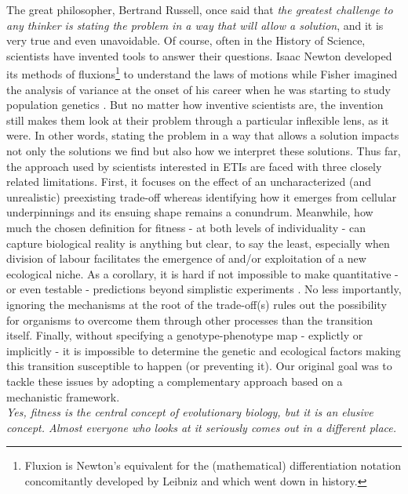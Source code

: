 The great philosopher, Bertrand Russell, once said that \textit{the greatest challenge to any thinker is stating the problem in a way that will allow a solution}, and it is very true and even unavoidable. Of course, often in the History of Science, scientists have invented tools to answer their questions. Isaac Newton developed its methods of fluxions\footnote{Fluxion is Newton's equivalent for the (mathematical) differentiation notation concomitantly developed by Leibniz and which went down in history.} to understand the laws of motions \citep{Kleiner01} while Fisher imagined the analysis of variance at the onset of his career when he was starting to study population genetics \citep{Fisher19,Fisher21,Conniffe91}. But no matter how inventive scientists are, the invention still makes them look at their problem through a particular inflexible lens, as it were. In other words, stating the problem in a way that allows a solution impacts not only the solutions we find but also how we interpret these solutions. Thus far, the approach used by scientists interested in ETIs are faced with three closely related limitations. First, it focuses on the effect of an uncharacterized (and unrealistic) preexisting trade-off whereas identifying how it emerges from cellular underpinnings and its ensuing shape remains a conundrum. Meanwhile, how much the chosen definition for fitness - at both levels of individuality - can capture biological reality is anything but clear, to say the least, especially when division of labour facilitates the emergence of and/or exploitation of a new ecological niche. As a corollary, it is hard if not impossible to make quantitative - or even testable - predictions beyond simplistic experiments \citep{Ratcliff12,Bernardes21}. No less importantly, ignoring the mechanisms at the root of the trade-off(s) rules out the possibility for organisms to overcome them through other processes than the transition itself.  Finally, without specifying a genotype-phenotype map - explictly or implicitly - it is impossible to determine the genetic and ecological factors making this transition susceptible to happen (or preventing it). Our original goal was to tackle these issues by adopting a complementary approach based on a mechanistic framework.\\

\textit{Yes, fitness is the central concept of evolutionary biology, but it is an elusive concept. Almost everyone who looks at it seriously comes out in a different place.}

